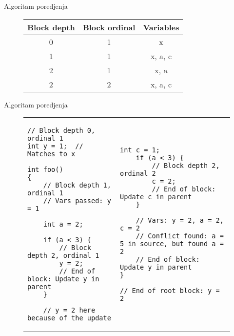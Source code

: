 \begin{frame}[fragile]{Algoritam poredjenja}
\begin{figure}[!h]
\centering
\begin{tabular}{ | c | c | c |}
    \hline
    Block depth & Block ordinal & Variables \\
    \hline
    0 & 1 & x \\
    1 & 1 & x, a, c \\
    2 & 1 & x, a \\
    2 & 2 & x, a, c \\
    \hline
\end{tabular}
\end{figure}
\end{frame}



\begin{frame}[fragile]{Algoritam poredjenja}
\begin{figure}[!h]
\centering
\begin{tabular}{ p{4.5cm} p{4.5cm} }
\begin{lstlisting}[basicstyle=\tiny\ttfamily]
// Block depth 0, ordinal 1
int y = 1;  // Matches to x

int foo()
{
    // Block depth 1, ordinal 1
    // Vars passed: y = 1

    int a = 2;

    if (a < 3) {
        // Block depth 2, ordinal 1
        y = 2;
        // End of block: Update y in parent
    }

    // y = 2 here because of the update
\end{lstlisting}
&
\begin{lstlisting}[basicstyle=\tiny\ttfamily]
    int c = 1;
    if (a < 3) {
        // Block depth 2, ordinal 2
        c = 2;
        // End of block: Update c in parent
    }

    // Vars: y = 2, a = 2, c = 2
    // Conflict found: a = 5 in source, but found a = 2
    // End of block: Update y in parent
}

// End of root block: y = 2
\end{lstlisting}
\end{tabular}
\end{figure}
\end{frame}


